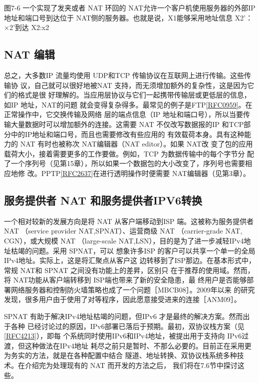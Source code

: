 图7-6 一个实现了发夹或者 NAT 环回的 NAT允许一个客户机使用服务器的外部IP
地址和端口号到达位于 NAT侧的服务器。也就是说，X1能够采用地址信息
X2'：×2'到达 X2:x2

\subsection{NAT 编辑}

总之，大多数IP 流量均使用 UDP和TCP 传输协议在互联网上进行传输。这些传输协
议，自己就可以很好地被NAT 支持，而无须增加额外的复杂性，这是因为它们的格式是很
好理解的。当应用层协议与它们一起携带传输层或更低层的信息，如IP 地址，NAT的问题
就会变得复杂得多。最常见的例子是FTP\href{https://www.rfc-editor.org/rfc/rfc0959}{[RFC0959]}。在正常操作中，它交换传输及网络
层的端点信息（IP 地址和端口号），所以当要传输大量数据时可以增加额外的连接。这需要
NAT 不仅改写数据报的IP 和TCP部分中的IP地址和端口号，而且也需要修改有些应用的
有效载荷本身。具有这种能力的 NAT 有时也被称次 NAT编辑器（NAT editor）。如果 NAT改
变了包的应用载荷大小，接着需要更多的工作要做。例如，TCP 为数据传输中的每个字节分
配了一个序列号（见第15章），所以如果一个数据包的大小改变了，序列号也需要相应地修
改。PPTP\href{https://www.rfc-editor.org/rfc/rfc2637}{[RFC2637]}在进行透明操作时便需要 NAT编辑器（见第3章）。

\subsection{服务提供者 NAT 和服务提供者IPV6转换}

一个相对较新的发展方向是将 NAT 从客户端移动到ISP 端。这被称为服务提供者 NAT
（service provider NAT,SPNAT）、运营商级 NAT （carrier-grade NAT, CGN），或大规模 NAT
（large-scale NAT,LSN），目的是为了进一步减轻IPv4地址枯竭的问题。采用 SPNAT，可以
想象许多ISP 的客户可以共享一个单一的全局IPv4地址。实际上，这是将汇聚点从客户这
边转移到了ISP那边。在基本形式中，常规 NAT和 SPNAT 之间没有功能上的差昇，区别只
在于推荐的使用域。然而，将 NAT功能从客户端转移到 ISP端也带来了新的安全隐患，最
终用户是否能够部署网络服务器和控制防火墙策略也成了一个问题［MBCB08］。2009年以来
的研究发现，很多用户由于使用了对等程序，因此愿意接受进来的连接［ANM09］。

SPNAT 有助于解决IPv4地址枯竭的问题，但IPv6 才是最终的解决方案。然而出于各种
已经讨论过的原因，IPv6部署已落后于预期。最初，双协议栈方案（见\href{https://www.rfc-editor.org/rfc/rfc4213}{[RFC4213]}），即每
个系统同时使用IPv6和IPv4地址，被提出用于支持向 IPv6过渡，但这种做法在IPv4地址
耗尽之前只是暂时、不那么必要的。目前正在采用更为务实的方法，就是在各种配置中结合
隧道、地址转换、双协议栈系统多种技术。在介绍完为处理现有的 NAT 而开发的方法之后，
我们将在7.6节中探讨这些。

